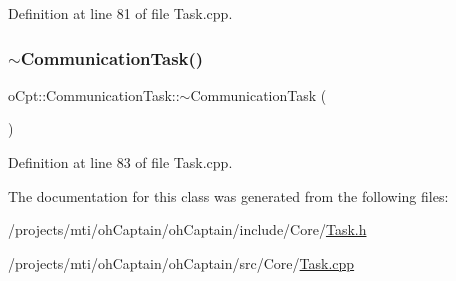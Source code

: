 Definition at line 81 of file Task.\+cpp.

\hypertarget{classo_cpt_1_1_communication_task_a046da901df467610f94dbe0a8e3add00}{}\label{classo_cpt_1_1_communication_task_a046da901df467610f94dbe0a8e3add00} 
\subsubsection{\texorpdfstring{$\sim$\+Communication\+Task()}{~CommunicationTask()}}
{\footnotesize\ttfamily o\+Cpt\+::\+Communication\+Task\+::$\sim$\+Communication\+Task (\begin{DoxyParamCaption}{ }\end{DoxyParamCaption})\hspace{0.3cm}{\ttfamily [virtual]}}



Definition at line 83 of file Task.\+cpp.



The documentation for this class was generated from the following files\+:\begin{DoxyCompactItemize}
\item 
/projects/mti/oh\+Captain/oh\+Captain/include/\+Core/\hyperlink{_task_8h}{Task.\+h}\item 
/projects/mti/oh\+Captain/oh\+Captain/src/\+Core/\hyperlink{_task_8cpp}{Task.\+cpp}\end{DoxyCompactItemize}
